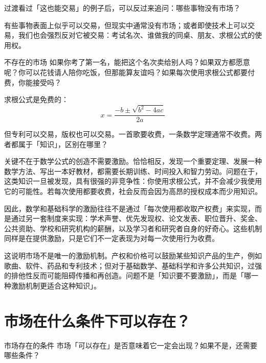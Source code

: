 \documentclass[10pt,a4paper]{ctexart}
\newcommand{\transitionnote}[1]{%
  \begin{conceptbox}{过渡}#1\end{conceptbox}%
}
\begin{document}
\transitionnote{看过「这也能交易」的例子后，可以反过来追问：哪些事物没有市场？}

有些事物表面上似乎可以交易，但现实中通常没有市场；或者即使技术上可以交易，我们也会强烈反对它被交易：考试名次、谁做我的同桌、朋友、求根公式的使用权。

\begin{discussionbox}{不存在的市场}
如果你考了第一名，能把这个名次卖给别人吗？如果双方都愿意呢？你可以花钱请人陪你吃饭，但那能算友谊吗？如果每次使用求根公式都要付费，你能接受吗？
\end{discussionbox}

求根公式是免费的：
\[
x = \frac{-b \pm \sqrt{b^2 - 4ac}}{2a}
\]

但专利可以交易，版权也可以交易。一首歌要收费，一条数学定理通常不收费。两者都属于「知识」，区别在哪里？

关键不在于数学公式的创造不需要激励。恰恰相反，发现一个重要定理、发展一种数学方法、写出一本好教材，都需要长期训练、时间投入和智力劳动。问题在于，这类知识一旦被发现，具有很强的非竞争性：你使用求根公式，并不会减少我使用它的可能性。若每次使用都要收费，社会反而会因为高昂的授权成本而少用知识。

因此，数学和基础科学的激励往往不是通过「每次使用都收取产权费」来实现，而是通过另一套制度来实现：学术声誉、优先发现权、论文发表、职位晋升、奖金、公共资助、学校和研究机构的薪酬，以及学习者和研究者自身的好奇心。这些机制同样是在提供激励，只是它们不一定表现为对每一次使用行为收费。

这说明市场不是唯一的激励机制。产权和价格可以鼓励某些知识产品的生产，例如歌曲、软件、药品和专利技术；但对于基础数学、基础科学和许多公共知识，过强的排他性反而可能阻碍传播和再创造。问题不是「知识要不要激励」，而是「哪一种激励机制更适合这种知识」。

\section{市场在什么条件下可以存在？}

\begin{discussionbox}{市场存在的条件}
市场「可以存在」是否意味着它一定会出现？如果不是，还需要哪些条件？
\end{discussionbox}
\end{document}
